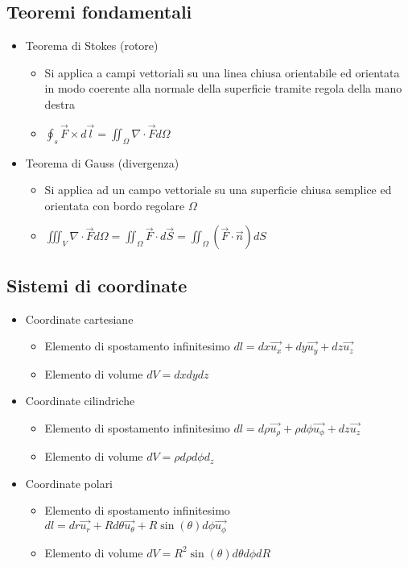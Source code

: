\documentclass{article}
\begin{document}
\newpage

\subsection{Teoremi fondamentali}
\begin{itemize}
	\item Teorema di Stokes (rotore)
	      \begin{itemize}
		      \item Si applica a campi vettoriali su una linea chiusa orientabile ed orientata in modo coerente alla normale della superficie tramite regola della mano destra
		      \item \( \displaystyle \oint_s \vec{F} \times d\vec{l} = \iint_\Omega \nabla \cdot \vec{F} d\Omega \)
	      \end{itemize}
	\item Teorema di Gauss (divergenza)
	      \begin{itemize}
		      \item Si applica ad un campo vettoriale su una superficie chiusa semplice ed orientata con bordo regolare \( \Omega \)
		      \item \( \displaystyle \iiint_V \nabla \cdot \vec{F} d\Omega = \iint_\Omega \vec{F} \cdot d\vec{S} = \iint_\Omega \left( \vec{F} \cdot \vec{n} \right) dS \)
	      \end{itemize}
\end{itemize}

\subsection{Sistemi di coordinate}
\begin{itemize}
	\item Coordinate cartesiane
	      \begin{itemize}
		      \item Elemento di spostamento infinitesimo \( dl = dx \vec{u_x} + dy \vec{u_y} + dz \vec{u_z} \)
		      \item Elemento di volume \( dV = dx dy dz \)
	      \end{itemize}

	\item Coordinate cilindriche
	      \begin{itemize}
		      \item Elemento di spostamento infinitesimo \( dl = d\rho \vec{u_\rho} + \rho d\phi \vec{u_\phi} + dz \vec{u_z} \)
		      \item Elemento di volume \( dV = \rho d\rho d\phi d_z\)
	      \end{itemize}

	\item Coordinate polari
	      \begin{itemize}
		      \item Elemento di spostamento infinitesimo \( dl = dr \vec{u_r} + R d\theta \vec{u_\theta} + R \sin\left(\theta\right) d\phi \vec{u_\phi} \)
		      \item Elemento di volume \( dV = R^2 \sin\left(\theta\right) d\theta d\phi dR \)
	      \end{itemize}
\end{itemize}
\end{document}
